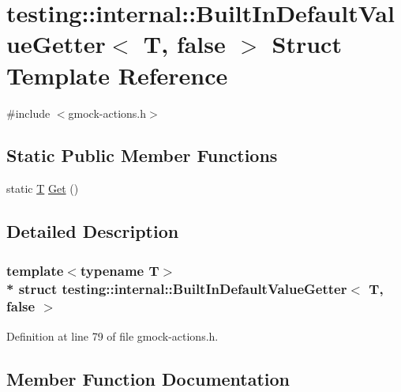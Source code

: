 \hypertarget{structtesting_1_1internal_1_1_built_in_default_value_getter_3_01_t_00_01false_01_4}{}\section{testing\+:\+:internal\+:\+:Built\+In\+Default\+Value\+Getter$<$ T, false $>$ Struct Template Reference}
\label{structtesting_1_1internal_1_1_built_in_default_value_getter_3_01_t_00_01false_01_4}


{\ttfamily \#include $<$gmock-\/actions.\+h$>$}

\subsection*{Static Public Member Functions}
\begin{DoxyCompactItemize}
\item 
static \hyperlink{functions__7_8js_adf1f3edb9115acb0a1e04209b7a9937b}{T} \hyperlink{structtesting_1_1internal_1_1_built_in_default_value_getter_3_01_t_00_01false_01_4_a8c8e929666f61272961eea21a60de4ad}{Get} ()
\end{DoxyCompactItemize}


\subsection{Detailed Description}
\subsubsection*{template$<$typename T$>$\\*
struct testing\+::internal\+::\+Built\+In\+Default\+Value\+Getter$<$ T, false $>$}



Definition at line 79 of file gmock-\/actions.\+h.



\subsection{Member Function Documentation}

